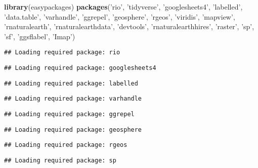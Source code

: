 \documentclass[
]{article}
\newenvironment{Shaded}{\begin{snugshade}}{\end{snugshade}}
\newcommand{\KeywordTok}[1]{\textcolor[rgb]{0.13,0.29,0.53}{\textbf{#1}}}
\newcommand{\NormalTok}[1]{#1}
\newcommand{\StringTok}[1]{\textcolor[rgb]{0.31,0.60,0.02}{#1}}
\begin{document}
\begin{Shaded}
\begin{Highlighting}[]
\KeywordTok{library}\NormalTok{(easypackages)}
\KeywordTok{packages}\NormalTok{(}\StringTok{'rio'}\NormalTok{, }\StringTok{'tidyverse'}\NormalTok{, }\StringTok{'googlesheets4'}\NormalTok{, }\StringTok{'labelled'}\NormalTok{, }\StringTok{'data.table'}\NormalTok{,}
         \StringTok{'varhandle'}\NormalTok{, }\StringTok{'ggrepel'}\NormalTok{, }\StringTok{'geosphere'}\NormalTok{, }\StringTok{'rgeos'}\NormalTok{, }\StringTok{'viridis'}\NormalTok{, }\StringTok{'mapview'}\NormalTok{,}
         \StringTok{'rnaturalearth'}\NormalTok{, }\StringTok{'rnaturalearthdata'}\NormalTok{, }\StringTok{'devtools'}\NormalTok{, }\StringTok{'rnaturalearthhires'}\NormalTok{,}
         \StringTok{'raster'}\NormalTok{, }\StringTok{'sp'}\NormalTok{, }\StringTok{'sf'}\NormalTok{, }\StringTok{'ggsflabel'}\NormalTok{, }\StringTok{'Imap'}\NormalTok{)}
\end{Highlighting}
\end{Shaded}

\begin{verbatim}
## Loading required package: rio
\end{verbatim}

\begin{verbatim}
## Loading required package: googlesheets4
\end{verbatim}

\begin{verbatim}
## Loading required package: labelled
\end{verbatim}

\begin{verbatim}
## Loading required package: varhandle
\end{verbatim}

\begin{verbatim}
## Loading required package: ggrepel
\end{verbatim}

\begin{verbatim}
## Loading required package: geosphere
\end{verbatim}

\begin{verbatim}
## Loading required package: rgeos
\end{verbatim}

\begin{verbatim}
## Loading required package: sp
\end{verbatim}
\end{document}

